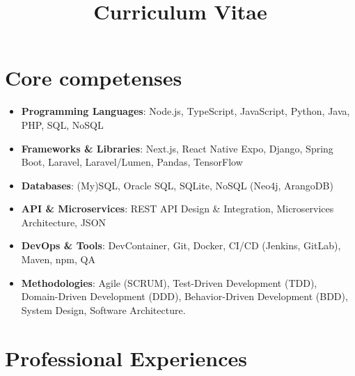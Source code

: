 \documentclass[12pt,a4paper,sans]{moderncv}
\title{Curriculum Vitae}
\begin{document}
\makecvtitle

\section{Core competenses}
\begin{itemize}
    \item \textbf{Programming Languages}: Node.js, TypeScript, JavaScript, Python, Java, PHP, SQL, NoSQL
    \item \textbf{Frameworks \& Libraries}: Next.js, React Native Expo, Django, Spring Boot, Laravel, Laravel/Lumen, Pandas, TensorFlow
    \item \textbf{Databases}: (My)SQL, Oracle SQL, SQLite, NoSQL (Neo4j, ArangoDB)
    \item \textbf{API \& Microservices}: REST API Design \& Integration, Microservices Architecture, JSON
    \item \textbf{DevOps \& Tools}: DevContainer, Git, Docker, CI/CD (Jenkins, GitLab), Maven, npm, QA
    \item \textbf{Methodologies}: Agile (SCRUM), Test-Driven Development (TDD), Domain-Driven Development (DDD), Behavior-Driven Development (BDD), System Design, Software Architecture. 
\end{itemize}
\section{Professional Experiences}
\end{document}
